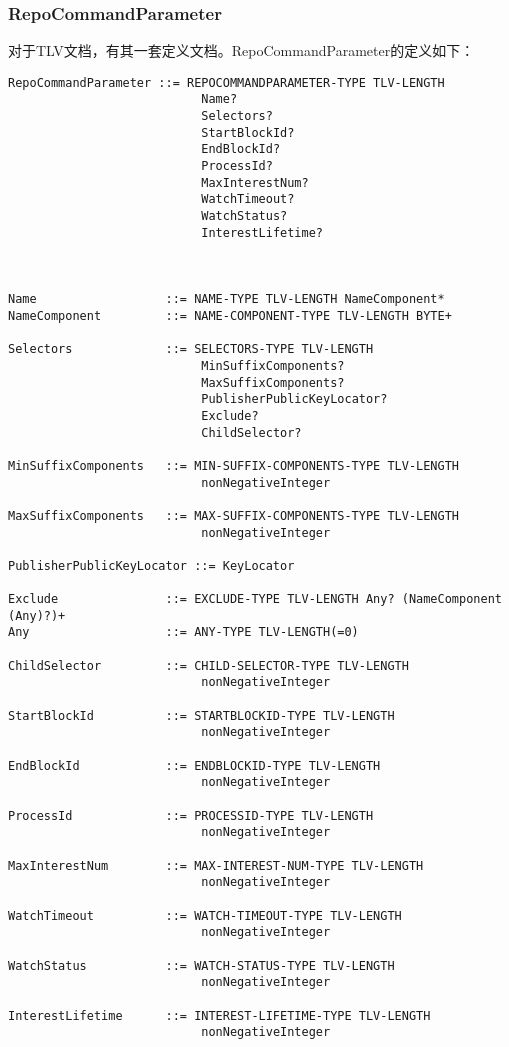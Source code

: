 \subsubsection{RepoCommandParameter}
对于TLV文档，有其一套定义文档。RepoCommandParameter的定义如下：
\begin{framed}
\begin{footnotesize}
\begin{verbatim}
RepoCommandParameter ::= REPOCOMMANDPARAMETER-TYPE TLV-LENGTH
                           Name?
                           Selectors?
                           StartBlockId?
                           EndBlockId?
                           ProcessId?
                           MaxInterestNum?
                           WatchTimeout?
                           WatchStatus?
                           InterestLifetime?



Name                  ::= NAME-TYPE TLV-LENGTH NameComponent*
NameComponent         ::= NAME-COMPONENT-TYPE TLV-LENGTH BYTE+

Selectors             ::= SELECTORS-TYPE TLV-LENGTH
                           MinSuffixComponents?
                           MaxSuffixComponents?
                           PublisherPublicKeyLocator?
                           Exclude?
                           ChildSelector?

MinSuffixComponents   ::= MIN-SUFFIX-COMPONENTS-TYPE TLV-LENGTH
                           nonNegativeInteger

MaxSuffixComponents   ::= MAX-SUFFIX-COMPONENTS-TYPE TLV-LENGTH
                           nonNegativeInteger

PublisherPublicKeyLocator ::= KeyLocator

Exclude               ::= EXCLUDE-TYPE TLV-LENGTH Any? (NameComponent (Any)?)+
Any                   ::= ANY-TYPE TLV-LENGTH(=0)

ChildSelector         ::= CHILD-SELECTOR-TYPE TLV-LENGTH
                           nonNegativeInteger

StartBlockId          ::= STARTBLOCKID-TYPE TLV-LENGTH
                           nonNegativeInteger

EndBlockId            ::= ENDBLOCKID-TYPE TLV-LENGTH
                           nonNegativeInteger

ProcessId             ::= PROCESSID-TYPE TLV-LENGTH
                           nonNegativeInteger

MaxInterestNum        ::= MAX-INTEREST-NUM-TYPE TLV-LENGTH
                           nonNegativeInteger

WatchTimeout          ::= WATCH-TIMEOUT-TYPE TLV-LENGTH
                           nonNegativeInteger

WatchStatus           ::= WATCH-STATUS-TYPE TLV-LENGTH
                           nonNegativeInteger

InterestLifetime      ::= INTEREST-LIFETIME-TYPE TLV-LENGTH
                           nonNegativeInteger
\end{verbatim}
\end{footnotesize}
\end{framed}

